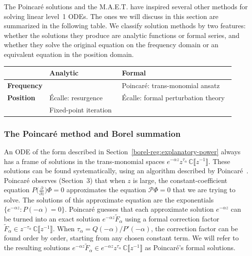 \documentclass{article}
\newcommand{\C}{\mathbb{C}}
\newcommand{\series}[1]{\tilde{#1}}
\theoremstyle{definition}
\theoremstyle{plain}
\newenvironment{verify}{\color{ForestGreen}}{\color{black}}
\begin{document}
The Poincar\'{e} solutions and the M.A.E.T. have inspired several other methods for solving linear level~1 ODEs. The ones we will discuss in this section are summarized in the following table. We classify solution methods by two features: whether the solutions they produce are analytic functions or formal series, and whether they solve the original equation on the frequency domain or an equivalent equation in the position domain.
\begin{center}
\begin{tabular}{l|l|l}
& \textbf{Analytic} & \textbf{Formal} \\ \hline
\textbf{Frequency} &  & Poincar\'{e}: trans-monomial ansatz~\cite{int-irreg} \\ \hline
\textbf{Position} & \'{E}calle: resurgence  & \'{E}calle: formal perturbation theory~\cite{EcalleIII,loday-Remy2011} \\
& Fixed-point iteration~\cite{reg-sing-volterra} \\
\end{tabular}
\end{center}
%
\subsubsection{The Poincar\'{e} method and Borel summation}\label{sec:Poincare method}
%
An ODE of the form described in Section~\ref{borel-reg:explanatory-power} always has a frame of solutions in the trans-monomial spaces $e^{-\alpha z} z^{\tau_\alpha}\,\C\llbracket z^{-1} \rrbracket$. These solutions can be found systematically, using an algorithm described by Poincar\'{e}~\cite{int-irreg}\cite[Proposition~2.2.7, p.~111]{EcalleIII}. Poincar\'{e} observes \begin{verify}(Section~3)\end{verify} that when $z$ is large, the constant-coefficient equation $P\big(\tfrac{\partial}{\partial z}\big) \Phi = 0$ approximates the equation $\mathcal{P}\Phi = 0$ that we are trying to solve. The solutions of this approximate equation are the exponentials $\{e^{-\alpha z} \colon P(-\alpha) = 0\}$. Poincar\'{e} guesses that each approximate solution $e^{-\alpha z}$ can be turned into an exact solution $e^{-\alpha z} \series{F}_\alpha$ using a formal correction factor $\series{F}_\alpha \in z^{-\tau_\alpha}\,\C\llbracket z^{-1} \rrbracket$. When $\tau_\alpha = Q(-\alpha) / P'(-\alpha)$, the correction factor can be found order by order, starting from any chosen constant term. We will refer to the resulting solutions $e^{-\alpha z} \series{F}_\alpha \in e^{-\alpha z} z^{\tau_\alpha}\,\C\llbracket z^{-1} \rrbracket$ as Poincar\'{e}'s formal solutions.
\end{document}
